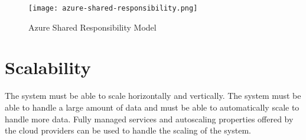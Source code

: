     \begin{figure}[htbp]
        \centering
        \texttt{[image: azure-shared-responsibility.png]}
        \caption{Azure Shared Responsibility Model}
    \end{figure}

\section{Scalability}
The system must be able to scale horizontally and vertically. The system must be able to handle a large amount of data and must be able to automatically scale to handle more data. Fully managed services and autoscaling properties offered by the cloud providers can be used to handle the scaling of the system.
